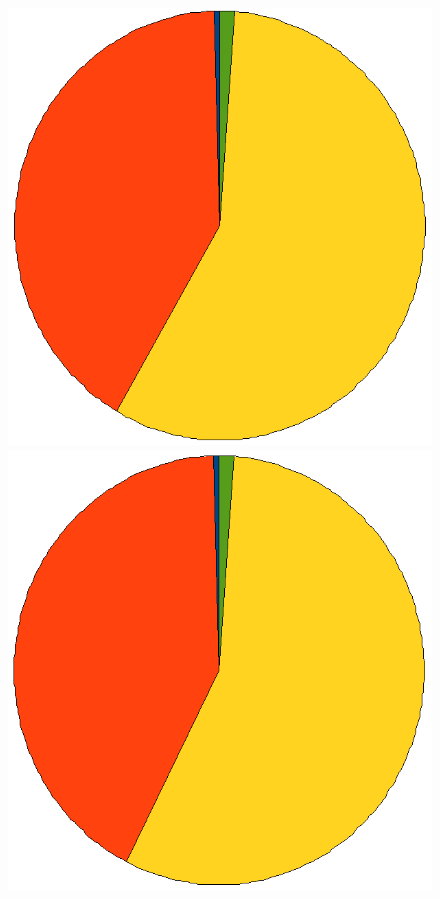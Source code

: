 	\begin{figure}[h]
	\centering
	\includegraphics[height=0.175\textheight]{charts/incr_hq_1.png}
	\includegraphics[height=0.175\textheight]{charts/incr_hq_2.png}

\end{figure}
